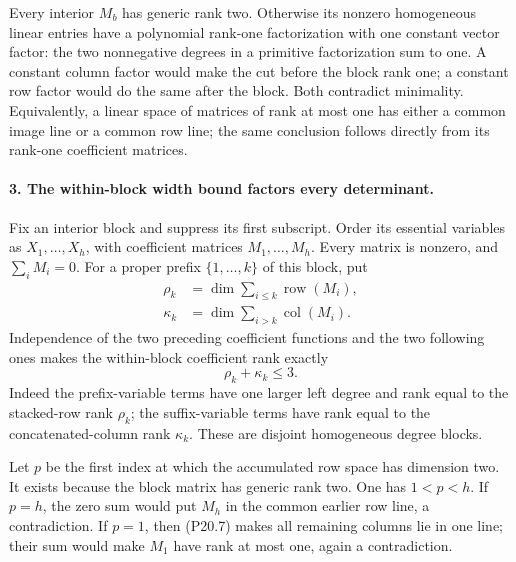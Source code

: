 Every interior $M_b$ has generic rank two. Otherwise its
nonzero homogeneous linear entries have a polynomial
rank-one factorization with one constant vector factor:
the two nonnegative degrees in a primitive factorization
sum to one. A constant column factor would make the cut
before the block rank one; a constant row factor would
do the same after the block. Both contradict minimality.
Equivalently, a linear space of matrices of rank at most
one has either a common image line or a common row line;
the same conclusion follows directly from its rank-one
coefficient matrices.

\paragraph{3. The within-block width bound factors every determinant.}
Fix an interior block and suppress its first subscript.
Order its essential variables as $X_1,\ldots,X_h$, with
coefficient matrices $M_1,\ldots,M_h$. Every matrix is
nonzero, and $\sum_iM_i=0$.
For a proper prefix $\{1,\ldots,k\}$ of this block, put
\[
 \begin{aligned}
 \rho_k&=\dim\sum_{i\le k}\operatorname{row}(M_i),\\
 \kappa_k&=\dim\sum_{i>k}\operatorname{col}(M_i).
 \end{aligned}
\]
Independence of the two preceding coefficient functions
and the two following ones makes the within-block
coefficient rank exactly
\[
                         \rho_k+\kappa_k\le3.
 \tag{P20.7}
\]
Indeed the prefix-variable terms have one larger left
degree and rank equal to the stacked-row rank $\rho_k$;
the suffix-variable terms have rank equal to the
concatenated-column rank $\kappa_k$. These are disjoint
homogeneous degree blocks.

Let $p$ be the first index at which the accumulated row
space has dimension two. It exists because the block
matrix has generic rank two. One has $1<p<h$. If $p=h$,
the zero sum would put $M_h$ in the common earlier row
line, a contradiction. If $p=1$, then (P20.7) makes all
remaining columns lie in one line; their sum would make
$M_1$ have rank at most one, again a contradiction.

